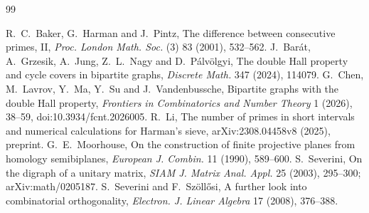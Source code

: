 \documentclass[11pt]{amsart}
\theoremstyle{definition}
\theoremstyle{remark}
\begin{document}
\begin{thebibliography}{99}
\raggedright
{} R.~C.~Baker, G.~Harman and J.~Pintz, The difference between consecutive
primes, II, \emph{Proc. London Math. Soc.} (3) 83 (2001), 532--562.
 J.~Bar\'at, A.~Grzesik, A.~Jung, Z.~L.~Nagy and D.~P\'alv\"olgyi, The double
Hall property and cycle covers in bipartite graphs, \emph{Discrete Math.} 347 (2024), 114079.
 G.~Chen, M.~Lavrov, Y.~Ma, Y.~Su and J.~Vandenbussche, Bipartite graphs with
the double Hall property, \emph{Frontiers in Combinatorics and Number Theory} 1 (2026), 38--59,
doi:10.3934/fcnt.2026005.
 R.~Li, The number of primes in short intervals and numerical calculations for
Harman's sieve, \mbox{arXiv:2308.04458v8} (2025), preprint.
 G.~E.~Moorhouse, On the construction of finite projective planes from
homology semibiplanes, \emph{European J. Combin.} 11 (1990), 589--600.
 S.~Severini, On the digraph of a unitary matrix, \emph{SIAM J. Matrix Anal.
Appl.} 25 (2003), 295--300; \mbox{arXiv:math/0205187}.
 S.~Severini and F.~Sz\"oll\H{o}si, A further look into
combinatorial orthogonality, \emph{Electron. J. Linear Algebra} 17 (2008), 376--388.
\end{thebibliography}
\end{document}
